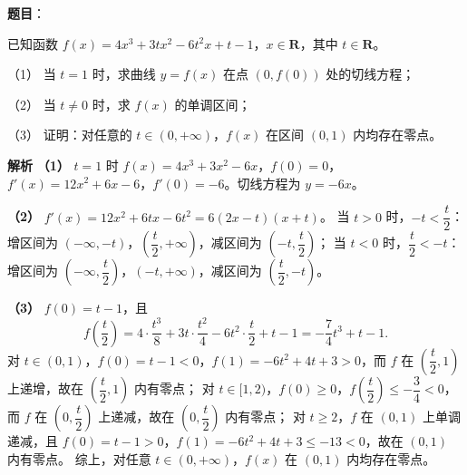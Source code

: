 \begin{answer}

\textbf{题目}：

已知函数 $f(x)=4x^3+3tx^2-6t^2x+t-1$，$x\in\mathbf R$，其中 $t\in\mathbf R$。

（1） 当 $t=1$ 时，求曲线 $y=f(x)$ 在点 $(0,f(0))$ 处的切线方程；

（2） 当 $t\neq0$ 时，求 $f(x)$ 的单调区间；

（3） 证明：对任意的 $t\in(0,+\infty)$，$f(x)$ 在区间 $(0,1)$ 内均存在零点。

\textbf{解析}
\textbf{（1）} $t=1$ 时 $f(x)=4x^3+3x^2-6x$，$f(0)=0$，$f'(x)=12x^2+6x-6$，$f'(0)=-6$。切线方程为 $y=-6x$。

\textbf{（2）} $f'(x)=12x^2+6tx-6t^2=6(2x-t)(x+t)$。
当 $t>0$ 时，$-t<\dfrac t2$：增区间为 $(-\infty,-t)$，$\left(\dfrac t2,+\infty\right)$，减区间为 $\left(-t,\dfrac t2\right)$；
当 $t<0$ 时，$\dfrac t2<-t$：增区间为 $\left(-\infty,\dfrac t2\right)$，$(-t,+\infty)$，减区间为 $\left(\dfrac t2,-t\right)$。

\textbf{（3）} $f(0)=t-1$，且
\nopagebreak[4]
\[f\left(\frac t2\right)=4\cdot\frac{t^3}8+3t\cdot\frac{t^2}4-6t^2\cdot\frac t2+t-1=-\frac74t^3+t-1.\]
对 $t\in(0,1)$，$f(0)=t-1<0$，$f(1)=-6t^2+4t+3>0$，而 $f$ 在 $\left(\dfrac t2,1\right)$ 上递增，故在 $\left(\dfrac t2,1\right)$ 内有零点；
对 $t\in[1,2)$，$f(0)\geqslant0$，$f\left(\dfrac t2\right)\leqslant-\dfrac34<0$，而 $f$ 在 $\left(0,\dfrac t2\right)$ 上递减，故在 $\left(0,\dfrac t2\right)$ 内有零点；
对 $t\geqslant2$，$f$ 在 $(0,1)$ 上单调递减，且 $f(0)=t-1>0$，$f(1)=-6t^2+4t+3\leqslant-13<0$，故在 $(0,1)$ 内有零点。
综上，对任意 $t\in(0,+\infty)$，$f(x)$ 在 $(0,1)$ 内均存在零点。




\end{answer}
